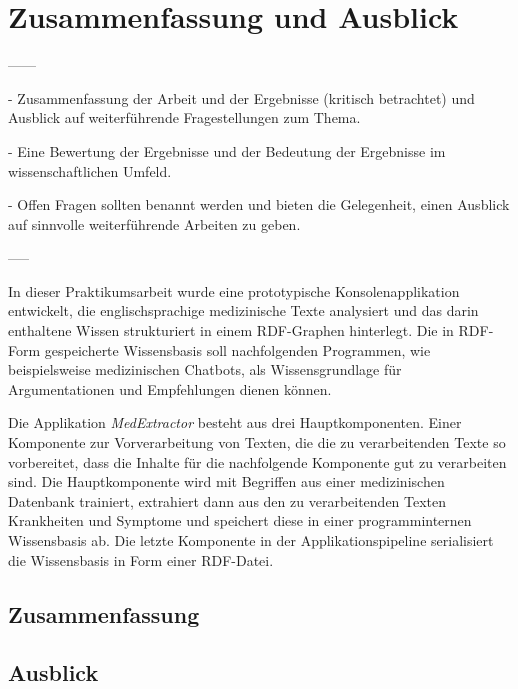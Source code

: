 \chapter{Zusammenfassung und Ausblick}
\label{ch:zusammenfassung}


------

- Zusammenfassung der Arbeit und der Ergebnisse (kritisch betrachtet) und Ausblick auf weiterführende Fragestellungen zum Thema.


- Eine Bewertung der Ergebnisse und der Bedeutung der Ergebnisse im wissenschaftlichen Umfeld.


- Offen Fragen sollten benannt werden und bieten die Gelegenheit, einen Ausblick auf sinnvolle weiterführende Arbeiten zu geben.

-----


In dieser Praktikumsarbeit wurde eine prototypische Konsolenapplikation entwickelt, die englischsprachige medizinische Texte analysiert und das darin enthaltene Wissen strukturiert in einem RDF-Graphen hinterlegt. Die in RDF-Form gespeicherte Wissensbasis soll nachfolgenden Programmen, wie beispielsweise medizinischen Chatbots, als Wissensgrundlage für Argumentationen und Empfehlungen dienen können.

Die Applikation \emph{MedExtractor} besteht aus drei Hauptkomponenten. Einer Komponente zur Vorverarbeitung von Texten, die die zu verarbeitenden Texte so vorbereitet, dass die Inhalte für die nachfolgende Komponente gut zu verarbeiten sind. Die Hauptkomponente wird mit Begriffen aus einer medizinischen Datenbank trainiert, extrahiert dann aus den zu verarbeitenden Texten Krankheiten und Symptome und speichert diese in einer programminternen Wissensbasis ab. Die letzte Komponente in der Applikationspipeline serialisiert die Wissensbasis in Form einer RDF-Datei.


\section{Zusammenfassung}
\label{sec:Zusammenfassung} 

\section{Ausblick}
\label{sec:Ausblick} 
